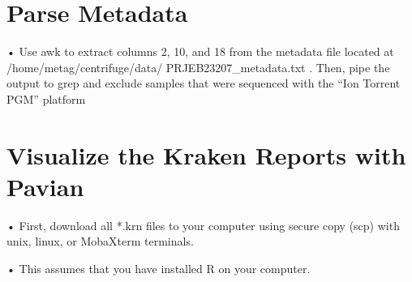 \documentclass[
]{book}
\newenvironment{Shaded}{\begin{snugshade}}{\end{snugshade}}
\newcommand{\AttributeTok}[1]{\textcolor[rgb]{0.77,0.63,0.00}{#1}}
\newcommand{\CommentTok}[1]{\textcolor[rgb]{0.56,0.35,0.01}{\textit{#1}}}
\newcommand{\DataTypeTok}[1]{\textcolor[rgb]{0.13,0.29,0.53}{#1}}
\newcommand{\FunctionTok}[1]{\textcolor[rgb]{0.00,0.00,0.00}{#1}}
\newcommand{\KeywordTok}[1]{\textcolor[rgb]{0.13,0.29,0.53}{\textbf{#1}}}
\newcommand{\NormalTok}[1]{#1}
\newcommand{\StringTok}[1]{\textcolor[rgb]{0.31,0.60,0.02}{#1}}
\newcommand{\VariableTok}[1]{\textcolor[rgb]{0.00,0.00,0.00}{#1}}
\begin{document}
\hypertarget{parse-metadata}{%
\section{Parse Metadata}\label{parse-metadata}}

• Use awk to extract columns 2, 10, and 18 from the metadata file located at /home/metag/centrifuge/data/
PRJEB23207\_metadata.txt . Then, pipe the output to grep and exclude samples that were sequenced with the ``Ion
Torrent PGM'' platform

\begin{Shaded}
\end{Shaded}

\hypertarget{visualize-the-kraken-reports-with-pavian}{%
\section{Visualize the Kraken Reports with Pavian}\label{visualize-the-kraken-reports-with-pavian}}

• First, download all *.krn files to your computer using secure copy (scp) with unix, linux, or MobaXterm terminals.

• This assumes that you have installed R on your computer.
\end{document}
